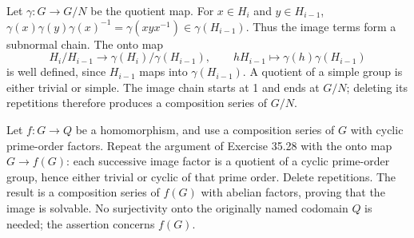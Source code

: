 Let $\gamma:G\to G/N$ be the quotient map. For $x\in H_i$ and $y\in H_{i-1}$,
$\gamma(x)\gamma(y)\gamma(x)^{-1}=\gamma(xyx^{-1})\in\gamma(H_{i-1})$.
Thus the image terms form a subnormal chain. The onto map
\[
H_i/H_{i-1}\longrightarrow
\gamma(H_i)/\gamma(H_{i-1}),\qquad
hH_{i-1}\longmapsto\gamma(h)\gamma(H_{i-1})
\]
is well defined, since $H_{i-1}$ maps into $\gamma(H_{i-1})$.
A quotient of a simple group is either trivial or simple. The image chain starts at 1 and ends at $G/N$; deleting its repetitions therefore produces a composition series of $G/N$.

Let $f:G\to Q$ be a homomorphism, and use a composition series of $G$ with cyclic prime-order factors. Repeat the argument of Exercise 35.28 with the onto map $G\to f(G)$: each successive image factor is a quotient of a cyclic prime-order group, hence either trivial or cyclic of that prime order.
Delete repetitions. The result is a composition series of $f(G)$ with abelian factors, proving that the image is solvable. No surjectivity onto the originally named codomain $Q$ is needed; the assertion concerns $f(G)$.
